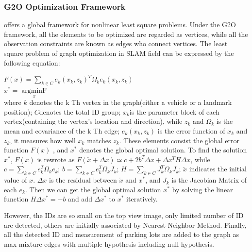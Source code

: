 \documentclass[journal]{IEEEtran}
\begin{document}
\subsubsection{G2O Optimization Framework}
\cite{K2011G2o} offers a global framework for nonlinear least square problems. 
Under the G2O framework, all the elements to be optimized are regarded as vertices, while all the observation constraints are known as edges who connect vertices. 
The least square problem of graph optimization in SLAM field can be expressed by the following equation:

$F(x)=\sum\limits_{k \in C}e_k{(x_k,z_k)}^T{\Omega}_k e_k(x_k,z_k)$\cite{K2011G2o}\\
$x^{*} = \mathop{argminF(x)}\limits_x$\cite{K2011G2o}\\
where $k$ denotes the k Th vertex in the graph(either a vehicle or a landmark position);  
$C$denotes the total ID group; $x_k$is the parameter block of each vertex(containing the vertex’s location and direction), 
while $z_k$ and $\Omega_k$ is the mean and covariance of the k Th edge; 
$e_k(x_k,z_k)$ is the error function of $x_k$ and $z_k$, it measures how well $x_k$ matches $z_k$. 
These elements consist the global error function $F(x)$ , and $x^*$ denotes the global optimal solution.
To find the solution $x^*$, $F(x)$ is rewrote as $F(\check{x}+\Delta x)\simeq c+2b^T \Delta x + \Delta x^T H \Delta x$, 
while $c=\sum\limits_{k \in C}e_k^T \Omega_k e_k$; 
$b=\sum\limits_{k \in C}e_k^T \Omega_k J_k$; 
$H=\sum\limits_{k \in C}J_k^T \Omega_k J_k$; 
$\check{x}$ indicates the initial value of ${x}$. 
$\Delta x$ is the residual between $\check{x}$  and $x^*$, and $J_k$ is the Jacobian Matrix of each $e_k$. 
Then we can get the global optimal solution $x^*$ by solving the linear function $H\Delta x^*=-b$ and add $\Delta x^*$ to $x^*$ iteratively.


However, the IDs are so small on the top view image, only limited number of ID are detected, others are initially associated by Nearest Neighbor Method. 
Finally, all the detected ID and measurement of parking lots are added to the graph as max mixture \cite{Pfingsthorn2014Representing} edges with multiple hypothesis including null hypothesis.
%
\end{document}
